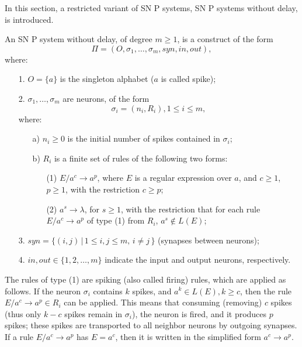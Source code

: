 \documentclass[runningheads]{llncs}
\begin{document}
In this section, a restricted variant of SN P systems, SN P systems
without delay, is introduced.

\begin{definition} An SN P system without delay, of degree $m\geq 1$,
is a construct of the form
$$\Pi=(O,\sigma_1,\ldots, \sigma_m, syn, in, out),$$
where:
\begin{enumerate}
\item[1.] $O=\{a\}$ is the singleton alphabet ($a$ is called spike);

\item[2.] $\sigma_1,\ldots, \sigma_m$ are neurons, of the form
$$\sigma_{i}=(n_i, R_i),1\leq i\leq m,$$
where:
\begin{enumerate}
\item[a)] $n_i\geq 0$ is the initial number of spikes contained in $\sigma_i$;

\item[b)] $R_i$ is a finite set of rules of the following two forms:
\begin{enumerate}
\item[(1)]$E/a^c \rightarrow a^p$, where $E$ is a regular expression
over $a$, and $c\geq 1$, $p\geq 1$, with the restriction $c\geq p$;
\item[(2)]$a^s\rightarrow \lambda$, for $s\geq 1$, with the
restriction that for each rule $E/a^c\rightarrow a^p$ of type (1)
from $R_i$, $a^s\notin L(E)$;
\end{enumerate}
\end{enumerate}
\item[3.] $syn= \{ (i,j)\, |\, 1\leq i,j \leq m, \, i\neq j\, \}$ (synapses
between neurons);

\item[4.] $in, out\in \{1,2,\ldots, m\}$ indicate the input and output neurons, respectively.
\end{enumerate}

\end{definition}

The rules of type (1) are spiking (also called firing) rules, which
are applied as follows. If the neuron $\sigma_i$ contains $k$
spikes, and $a^k \in L(E), k\geq c$, then the rule $E/a^c
\rightarrow a^p \in R_i$ can be applied. This means that consuming
(removing) $c$ spikes (thus only $k-c$ spikes remain in $\sigma_i$),
the neuron is fired, and it produces $p$ spikes; these spikes are
transported to all neighbor neurons by outgoing synapses. If a rule
$E/a^c\rightarrow a^p$ has $E=a^c$, then it is written in the
simplified form $a^c\rightarrow a^p$.
\end{document}
